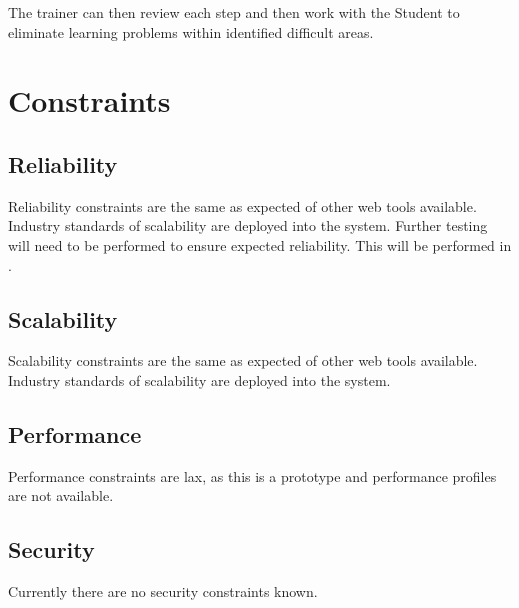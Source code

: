 \documentclass[11pt]{report}
\begin{document}
The trainer can then review each step and then work with the Student to eliminate learning problems within identified difficult areas.  

\section{Constraints}

\subsection{Reliability}

Reliability constraints are the same as expected of other web tools available. Industry standards of scalability are deployed into the system. Further testing will need to be performed to ensure expected reliability. This will be performed in .  

\subsection{Scalability}

Scalability constraints are the same as expected of other web tools available. Industry standards of scalability are deployed into the system. 

\subsection{Performance}

Performance constraints are lax, as this is a prototype and performance profiles are not available. 

\subsection{Security} 

Currently there are no security constraints known. 


{}
\end{document}
